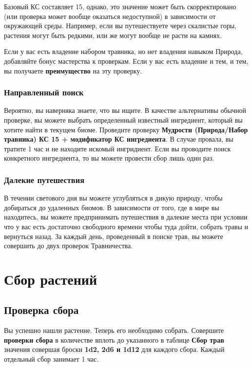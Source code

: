 \documentclass[a4paper, 9pt, twocolumn]{book}
\begin{document}
	Базовый КС составляет 15, однако, это значение может быть скорректировано (или проверка может вообще оказаться недоступной) в зависимости от окружающей среды. Например, если вы путешествуете через скалистые горы, растения могут быть редкими, или же могут вообще не расти на камнях.
	
	Если у вас есть владение набором травника, но нет владения навыком Природа, добавляйте бонус мастерства к проверкам. Если у вас есть владение и тем, и тем, вы получаете \textbf{преимущество} на эту проверку.
	
	\subsubsection*{Направленный поиск}
	
	Вероятно, вы наверняка знаете, что вы ищите. В качестве альтернативы обычной проверке, вы можете выбрать определенный известный ингредиент, который вы хотите найти в текущем биоме. Проведите проверку \textbf{Мудрости (Природа/Набор травника) КС 15 + модификатор КС ингредиента}. В случае провала, вы тратите 1 час и не находите искомый ингридиент. Если вы проводите поиск конкретного ингредиента, то вы можете провести сбор лишь один раз.
	
	\subsubsection*{Далекие путешествия}
	
	В течении светового дня вы можете углубляться в дикую природу, чтобы добираться до удаленных биомов. В зависимости от того, где в мире вы находитесь, вы можете предпринимать путешествия в далекие места при условии что у вас есть достаточно свободного времени чтобы туда дойти, собрать травы и вернуться назад. За каждый день, проведенный в поиске трав, вы можете совершить до двух проверок Травничества.
	
	\section{Сбор растений}
	
	\subsection{Проверка сбора}
	
	Вы успешно нашли растение. Теперь его необходимо собрать. Совершите \textbf{проверки сбора} в количестве вплоть до указанного в таблице \textbf{Сбор трав} значения совершая броски \textbf{1d2, 2d6 и 1d12} для каждого сбора. Каждый отдельный сбор занимает 1 час.
	
\end{document}
